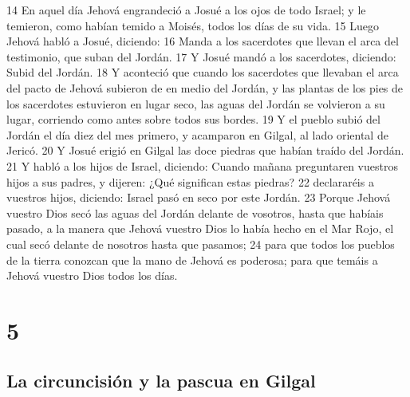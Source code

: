 14 En aquel día Jehová engrandeció a Josué a los ojos de todo Israel; y le temieron, como habían temido a Moisés, todos los días de su vida.
15 Luego Jehová habló a Josué, diciendo:
16 Manda a los sacerdotes que llevan el arca del testimonio, que suban del Jordán.
17 Y Josué mandó a los sacerdotes, diciendo: Subid del Jordán.
18 Y aconteció que cuando los sacerdotes que llevaban el arca del pacto de Jehová subieron de en medio del Jordán, y las plantas de los pies de los sacerdotes estuvieron en lugar seco, las aguas del Jordán se volvieron a su lugar, corriendo como antes sobre todos sus bordes.
19 Y el pueblo subió del Jordán el día diez del mes primero, y acamparon en Gilgal, al lado oriental de Jericó.
20 Y Josué erigió en Gilgal las doce piedras que habían traído del Jordán.
21 Y habló a los hijos de Israel, diciendo: Cuando mañana preguntaren vuestros hijos a sus padres, y dijeren: ¿Qué significan estas piedras?
22 declararéis a vuestros hijos, diciendo: Israel pasó en seco por este Jordán.
23 Porque Jehová vuestro Dios secó las aguas del Jordán delante de vosotros, hasta que habíais pasado, a la manera que Jehová vuestro Dios lo había hecho en el Mar Rojo, el cual secó delante de nosotros hasta que pasamos;
24 para que todos los pueblos de la tierra conozcan que la mano de Jehová es poderosa; para que temáis a Jehová vuestro Dios todos los días.

\chapter{5}

\section*{La circuncisión y la pascua en Gilgal}

